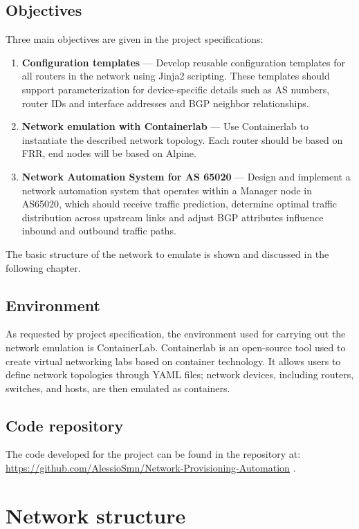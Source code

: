 \documentclass{report}
\begin{document}
\section{Objectives}
Three main objectives are given in the project specifications:
\begin{enumerate}
    \item \textbf{Configuration templates} --- Develop reusable configuration templates for  all routers in the network using Jinja2 scripting. These templates should support parameterization for device-specific details such as AS numbers, router IDs and interface addresses and BGP neighbor relationships.
    \item \textbf{Network emulation with Containerlab} --- Use Containerlab to instantiate the described network topology. Each router should be based on FRR, end nodes will be based on Alpine.
    \item \textbf{Network Automation System for AS 65020} --- Design and implement a  network automation system that operates within a Manager node in AS65020, which should receive traffic prediction, determine optimal traffic distribution across upstream links and adjust BGP attributes influence inbound and outbound traffic paths.
\end{enumerate}
The basic structure of the network to emulate is shown and discussed in the following chapter.
\section{Environment}
As requested by project specification, the environment used for carrying out the network emulation is ContainerLab. Containerlab is an open-source tool used to create virtual networking labs based on container technology. It allows users to define network topologies through YAML files; network devices, including routers, switches, and hosts, are then emulated as containers.
\section{Code repository}
The code developed for the project can be found in the repository at: \newline \url{https://github.com/AlessioSmn/Network-Provisioning-Automation} .



\chapter{Network structure}
\end{document}
